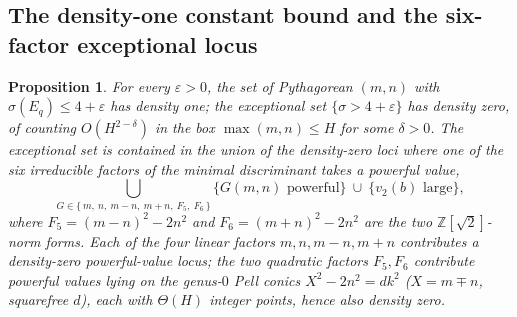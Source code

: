 \documentclass[11pt,reqno]{amsart}
\theoremstyle{plain}
\newtheorem{proposition}[theorem]{Proposition}
\theoremstyle{definition}
\newcommand{\Z}{\mathbb{Z}}
\begin{document}
\subsection{The density-one constant bound and the six-factor exceptional locus}

\begin{proposition}\label{prop:density}
For every $\varepsilon>0$, the set of Pythagorean $(m,n)$ with
$\sigma(E_q)\le 4+\varepsilon$ has density one; the exceptional set
$\{\sigma>4+\varepsilon\}$ has density zero, of counting $O(H^{2-\delta})$ in the
box $\max(m,n)\le H$ for some $\delta>0$. The exceptional set is contained in the
union of the density-zero loci where one of the six irreducible factors of the
minimal discriminant takes a powerful value,
\[
  \bigcup_{G\in\{\,m,\ n,\ m-n,\ m+n,\ F_5,\ F_6\,\}}\{G(m,n)\text{ powerful}\}
  \ \cup\ \{v_2(b)\text{ large}\},
\]
where $F_5=(m-n)^2-2n^2$ and $F_6=(m+n)^2-2n^2$ are the two $\Z[\sqrt2]$-norm forms.
Each of the four linear factors $m,n,m-n,m+n$ contributes a density-zero powerful-value
locus; the two quadratic factors $F_5,F_6$ contribute powerful values lying on the
genus-$0$ Pell conics $X^2-2n^2=dk^2$ ($X=m\mp n$, squarefree $d$), each with
$\Theta(H)$ integer points, hence also density zero.
\end{proposition}
\end{document}
